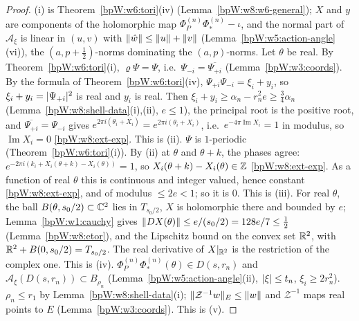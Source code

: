\begin{proof}
\label{stepW:w8:ts-bd} (i) is Theorem~\ref{bpW:w6:tori}(iv) (Lemma~\ref{bpW:w8:w6-general}); $X$ and $y$ are components of the
holomorphic map $\Phi^{(n)}_P\Phi^{(n)}_*-\iota$, and the normal part of $\mathcal A_\xi$ is linear in $(u,v)$ with
$\lVert \hat w\rVert\le\lVert u\rVert+\lVert v\rVert$ (Lemma~\ref{bpW:w5:action-angle}(vi)), the $(a,p+\frac12)$-norms dominating the $(a,p)$-norms.
\label{stepW:w8:ts-real} Let $\theta$ be real. By Theorem~\ref{bpW:w6:tori}(i), $\varrho\Psi=\Psi$, i.e.\
$\Psi_{-i}=\overline{\Psi_{+i}}$ (Lemma~\ref{bpW:w3:coords}). By the formula of Theorem~\ref{bpW:w6:tori}(iv),
$\Psi_{+i}\Psi_{-i}=\xi_i+y_i$, so $\xi_i+y_i=\lvert \Psi_{+i}\rvert^2$ is real and $y_i$ is real. Then
$\xi_i+y_i\ge\alpha_n-r_n^2e\ge\frac34\alpha_n$ (Lemma~\ref{bpW:w8:shell-data}(i),(ii), $e\le1$), the principal root is the positive
root, and $\overline{\Psi_{+i}}=\Psi_{-i}$ gives $e^{2\pi i(\theta_i+\overline{X_i})}=e^{2\pi i(\theta_i+X_i)}$, i.e.\
$e^{-4\pi\operatorname{Im}X_i}=1$ in modulus, so $\operatorname{Im}X_i=0$ \ref{bpW:w8:ext-exp}. This is (ii).
\proofstep{Periodicity}\label{stepW:w8:ts-per} $\Psi$ is $1$-periodic (Theorem~\ref{bpW:w6:tori}(i)). By (ii) at $\theta$ and $\theta+k$, the phases
agree: $e^{-2\pi i(k_i+X_i(\theta+k)-X_i(\theta))}=1$, so $X_i(\theta+k)-X_i(\theta)\in\mathbb{Z}$ \ref{bpW:w8:ext-exp}. As a function of real $\theta$
this is continuous and integer valued, hence constant \ref{bpW:w8:ext-exp}, and of modulus $\le2e<1$; so it is $0$. This is (iii).
\proofstep{Cauchy}\label{stepW:w8:ts-cauchy} For real $\theta$, the ball $B(\theta,s_0/2)\subset\mathbb{C}^2$ lies in $T_{s_0/2}$, $X$ is holomorphic there and
bounded by $e$; Lemma~\ref{bpW:w1:cauchy} gives $\lVert DX(\theta)\rVert\le e/(s_0/2)=128e/7\le\frac12$ (Lemma~\ref{bpW:w8:etor}), and the
Lipschitz bound on the convex set $\mathbb{R}^2$, with $\mathbb{R}^2+B(0,s_0/2)=T_{s_0/2}$. The real derivative of $X|_{\mathbb{R}^2}$ is the restriction of
the complex one. This is (iv).
\proofstep{Ball}\label{stepW:w8:ts-ball} $\Phi^{(n)}_P\Phi^{(n)}_*(\theta)\in D(s,r_n)$ and $\mathcal A_\xi(D(s,r_n))\subset B_{\rho_n}$
(Lemma~\ref{bpW:w5:action-angle}(ii), $\lvert \xi\rvert\le t_n$, $\xi_i\ge2r_n^2$). $\rho_n\le r_1$ by Lemma~\ref{bpW:w8:shell-data}(i);
$\lVert \mathcal Z^{-1}w\rVert_E\le\lVert w\rVert$ and $\mathcal Z^{-1}$ maps real points to $E$ (Lemma~\ref{bpW:w3:coords}). This is (v).
\end{proof}

